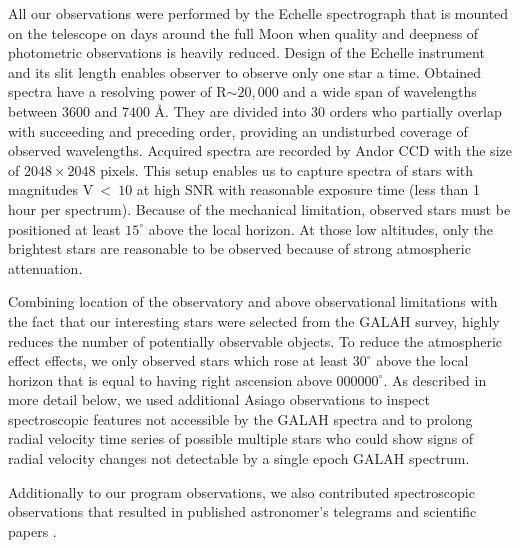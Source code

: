 All our observations were performed by the Echelle spectrograph that is mounted on the telescope on days around the full Moon when quality and deepness of photometric observations is heavily reduced. Design of the Echelle instrument and its slit length enables observer to observe only one star a time. Obtained spectra have a resolving power of R$\sim20,000$ and a wide span of wavelengths between $3600$ and $7400$ \AA. They are divided into 30 orders who partially overlap with succeeding and preceding order, providing an undisturbed coverage of observed wavelengths. Acquired spectra are recorded by Andor CCD with the size of $2048 \times 2048$ pixels. This setup enables us to capture spectra of stars with magnitudes V~<~$10$ at high SNR with reasonable exposure time (less than 1 hour per spectrum). Because of the mechanical limitation, observed stars must be positioned at least $15^\circ$ above the local horizon. At those low altitudes, only the brightest stars are reasonable to be observed because of strong atmospheric attenuation.

Combining location of the observatory and above observational limitations with the fact that our interesting stars were selected from the GALAH survey, highly reduces the number of potentially observable objects. To reduce the atmospheric effect effects, we only observed stars which rose at least $30^\circ$ above the local horizon that is equal to having right ascension above $000000^\circ$. As described in more detail below, we used additional Asiago observations to inspect spectroscopic features not accessible by the GALAH spectra and to prolong radial velocity time series of possible multiple stars who could show signs of radial velocity changes not detectable by a single epoch GALAH spectrum.

Additionally to our program observations, we also contributed spectroscopic observations that resulted in published astronomer's telegrams \citep{2019ATel13340....1M} and scientific papers \citep{2019MNRAS.488.5536M}.